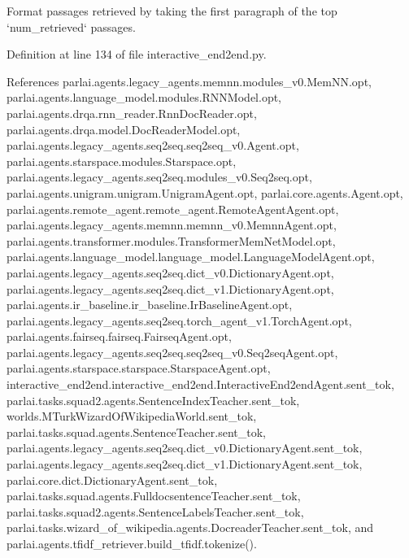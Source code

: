 \begin{DoxyVerb}Format passages retrieved by taking the first paragraph of the
top `num_retrieved` passages.
\end{DoxyVerb}
 

Definition at line 134 of file interactive\+\_\+end2end.\+py.



References parlai.\+agents.\+legacy\+\_\+agents.\+memnn.\+modules\+\_\+v0.\+Mem\+N\+N.\+opt, parlai.\+agents.\+language\+\_\+model.\+modules.\+R\+N\+N\+Model.\+opt, parlai.\+agents.\+drqa.\+rnn\+\_\+reader.\+Rnn\+Doc\+Reader.\+opt, parlai.\+agents.\+drqa.\+model.\+Doc\+Reader\+Model.\+opt, parlai.\+agents.\+legacy\+\_\+agents.\+seq2seq.\+seq2seq\+\_\+v0.\+Agent.\+opt, parlai.\+agents.\+starspace.\+modules.\+Starspace.\+opt, parlai.\+agents.\+legacy\+\_\+agents.\+seq2seq.\+modules\+\_\+v0.\+Seq2seq.\+opt, parlai.\+agents.\+unigram.\+unigram.\+Unigram\+Agent.\+opt, parlai.\+core.\+agents.\+Agent.\+opt, parlai.\+agents.\+remote\+\_\+agent.\+remote\+\_\+agent.\+Remote\+Agent\+Agent.\+opt, parlai.\+agents.\+legacy\+\_\+agents.\+memnn.\+memnn\+\_\+v0.\+Memnn\+Agent.\+opt, parlai.\+agents.\+transformer.\+modules.\+Transformer\+Mem\+Net\+Model.\+opt, parlai.\+agents.\+language\+\_\+model.\+language\+\_\+model.\+Language\+Model\+Agent.\+opt, parlai.\+agents.\+legacy\+\_\+agents.\+seq2seq.\+dict\+\_\+v0.\+Dictionary\+Agent.\+opt, parlai.\+agents.\+legacy\+\_\+agents.\+seq2seq.\+dict\+\_\+v1.\+Dictionary\+Agent.\+opt, parlai.\+agents.\+ir\+\_\+baseline.\+ir\+\_\+baseline.\+Ir\+Baseline\+Agent.\+opt, parlai.\+agents.\+legacy\+\_\+agents.\+seq2seq.\+torch\+\_\+agent\+\_\+v1.\+Torch\+Agent.\+opt, parlai.\+agents.\+fairseq.\+fairseq.\+Fairseq\+Agent.\+opt, parlai.\+agents.\+legacy\+\_\+agents.\+seq2seq.\+seq2seq\+\_\+v0.\+Seq2seq\+Agent.\+opt, parlai.\+agents.\+starspace.\+starspace.\+Starspace\+Agent.\+opt, interactive\+\_\+end2end.\+interactive\+\_\+end2end.\+Interactive\+End2end\+Agent.\+sent\+\_\+tok, parlai.\+tasks.\+squad2.\+agents.\+Sentence\+Index\+Teacher.\+sent\+\_\+tok, worlds.\+M\+Turk\+Wizard\+Of\+Wikipedia\+World.\+sent\+\_\+tok, parlai.\+tasks.\+squad.\+agents.\+Sentence\+Teacher.\+sent\+\_\+tok, parlai.\+agents.\+legacy\+\_\+agents.\+seq2seq.\+dict\+\_\+v0.\+Dictionary\+Agent.\+sent\+\_\+tok, parlai.\+agents.\+legacy\+\_\+agents.\+seq2seq.\+dict\+\_\+v1.\+Dictionary\+Agent.\+sent\+\_\+tok, parlai.\+core.\+dict.\+Dictionary\+Agent.\+sent\+\_\+tok, parlai.\+tasks.\+squad.\+agents.\+Fulldocsentence\+Teacher.\+sent\+\_\+tok, parlai.\+tasks.\+squad2.\+agents.\+Sentence\+Labels\+Teacher.\+sent\+\_\+tok, parlai.\+tasks.\+wizard\+\_\+of\+\_\+wikipedia.\+agents.\+Docreader\+Teacher.\+sent\+\_\+tok, and parlai.\+agents.\+tfidf\+\_\+retriever.\+build\+\_\+tfidf.\+tokenize().



